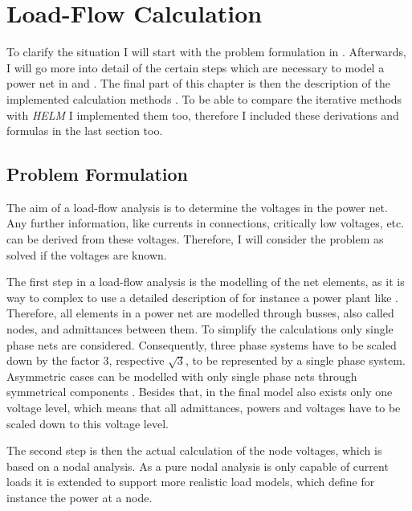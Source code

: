 \chapter{Load-Flow Calculation}

To clarify the situation I will start with the problem formulation in . Afterwards, I will go more into detail of the certain steps which are necessary to model a power net in  and . The final part of this chapter is then the description of the implemented calculation methods . To be able to compare the iterative methods with \emph{HELM} I implemented them too, therefore I included these derivations and formulas in the last section too.

\section{Problem Formulation}
\label{sec:problem_formulation}

The aim of a load-flow analysis is to determine the voltages in the power net. Any further information, like currents in connections, critically low voltages, etc. can be derived from these voltages. Therefore, I will consider the problem as solved if the voltages are known.

The first step in a load-flow analysis is the modelling of the net elements, as it is way to complex to use a detailed description of for instance a power plant like . Therefore, all elements in a power net are modelled through busses, also called nodes, and admittances between them. To simplify the calculations only single phase nets are considered. Consequently, three phase systems have to be scaled down by the factor 3, respective $\sqrt{3}$, to be represented by a single phase system. Asymmetric cases can be modelled with only single phase nets through symmetrical components \citep[p. 399]{powerSystemAnalysis}. Besides that, in the final model also exists only one voltage level, which means that all admittances, powers and voltages have to be scaled down to this voltage level.

The second step is then the actual calculation of the node voltages, which is based on a nodal analysis. As a pure nodal analysis is only capable of current loads it is extended to support more realistic load models, which define for instance the power at a node.

